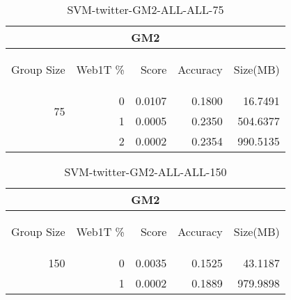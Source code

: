 \begin{center}
\begin{table}[htbp] 
 \begin{center}
\begin{tabular}{ | r | r | r | r | r |}
\hline
\multicolumn{5}{|c|}{GM2}\\
\hline
\begin{sideways}Group Size\end{sideways} & \begin{sideways}Web1T \%\end{sideways} & \begin{sideways}Score\end{sideways} & \begin{sideways}Accuracy\end{sideways} & \begin{sideways}Size(MB)\end{sideways}\\
\hline
\multirow{2}{*}{75}
 & 0 & 0.0107 & 0.1800 & 16.7491\\ \cline{2-5}
 & 1 & 0.0005 & 0.2350 & 504.6377\\ \cline{2-5}
 & 2 & 0.0002 & 0.2354 & 990.5135\\ \cline{2-5}
\hline
\end{tabular}
\caption{SVM-twitter-GM2-ALL-ALL-75}
\label{table:SVM-twitter-GM2-ALL-ALL-75}
\end{center}
 \end{table}
\end{center}

\begin{center}
\begin{table}[htbp] 
 \begin{center}
\begin{tabular}{ | r | r | r | r | r |}
\hline
\multicolumn{5}{|c|}{GM2}\\
\hline
\begin{sideways}Group Size\end{sideways} & \begin{sideways}Web1T \%\end{sideways} & \begin{sideways}Score\end{sideways} & \begin{sideways}Accuracy\end{sideways} & \begin{sideways}Size(MB)\end{sideways}\\
\hline
\multirow{1}{*}{150}
 & 0 & 0.0035 & 0.1525 & 43.1187\\ \cline{2-5}
 & 1 & 0.0002 & 0.1889 & 979.9898\\ \cline{2-5}
\hline
\end{tabular}
\caption{SVM-twitter-GM2-ALL-ALL-150}
\label{table:SVM-twitter-GM2-ALL-ALL-150}
\end{center}
 \end{table}
\end{center}

